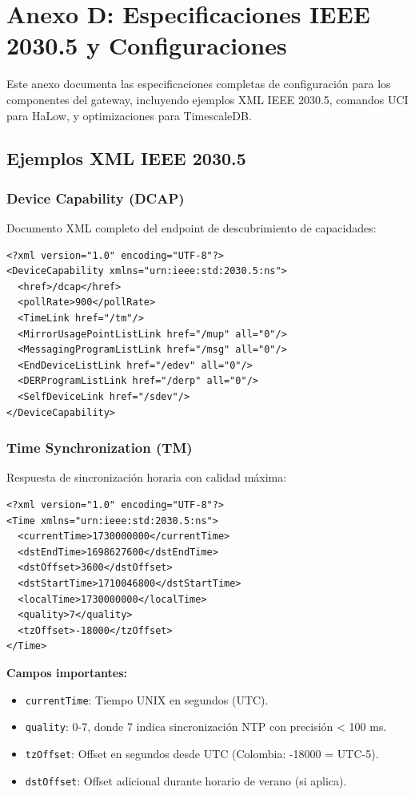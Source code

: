 ﻿\chapter{Anexo D: Especificaciones IEEE 2030.5 y Configuraciones}
\label{anexo:configs}

Este anexo documenta las especificaciones completas de configuración para los componentes del gateway, incluyendo ejemplos XML IEEE 2030.5, comandos UCI para HaLow, y optimizaciones para TimescaleDB.

\section{Ejemplos XML IEEE 2030.5}

\subsection{Device Capability (DCAP)}

Documento XML completo del endpoint de descubrimiento de capacidades:

\begin{verbatim}
<?xml version="1.0" encoding="UTF-8"?>
<DeviceCapability xmlns="urn:ieee:std:2030.5:ns">
  <href>/dcap</href>
  <pollRate>900</pollRate>
  <TimeLink href="/tm"/>
  <MirrorUsagePointListLink href="/mup" all="0"/>
  <MessagingProgramListLink href="/msg" all="0"/>
  <EndDeviceListLink href="/edev" all="0"/>
  <DERProgramListLink href="/derp" all="0"/>
  <SelfDeviceLink href="/sdev"/>
</DeviceCapability>
\end{verbatim}

\subsection{Time Synchronization (TM)}

Respuesta de sincronización horaria con calidad máxima:

\begin{verbatim}
<?xml version="1.0" encoding="UTF-8"?>
<Time xmlns="urn:ieee:std:2030.5:ns">
  <currentTime>1730000000</currentTime>
  <dstEndTime>1698627600</dstEndTime>
  <dstOffset>3600</dstOffset>
  <dstStartTime>1710046800</dstStartTime>
  <localTime>1730000000</localTime>
  <quality>7</quality>
  <tzOffset>-18000</tzOffset>
</Time>
\end{verbatim}

\textbf{Campos importantes:}
\begin{itemize}
    \item \texttt{currentTime}: Tiempo UNIX en segundos (UTC).
    \item \texttt{quality}: 0-7, donde 7 indica sincronización NTP con precisión < 100 ms.
    \item \texttt{tzOffset}: Offset en segundos desde UTC (Colombia: -18000 = UTC-5).
    \item \texttt{dstOffset}: Offset adicional durante horario de verano (si aplica).
\end{itemize}

